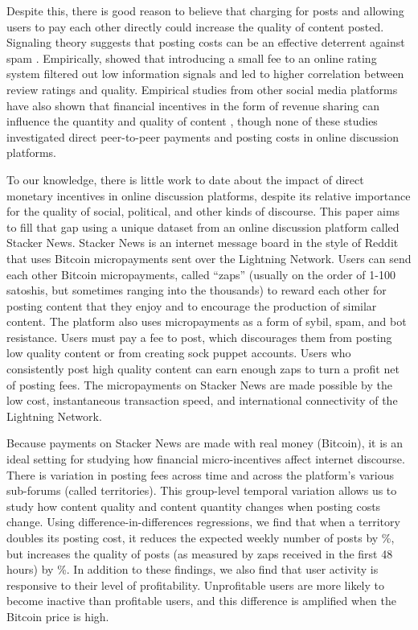 Despite this, there is good reason to believe that charging for posts and allowing users to pay each other directly could increase the quality of content posted. Signaling theory suggests that posting costs can be an effective deterrent against spam  \citep{joseph2008email}. Empirically, \citet{tchernichovski2019pnas} showed that introducing a small fee to an online rating system filtered out low information signals and led to higher correlation between review ratings and quality. Empirical studies from other social media platforms have also shown that financial incentives in the form of revenue sharing can influence the quantity and quality of content  \citep{sun2013blogs, elkomboz2023youtube, kerkhof2024youtube}, though none of these studies investigated direct peer-to-peer payments and posting costs in online discussion platforms.

To our knowledge, there is little work to date about the impact of direct monetary incentives in online discussion platforms, despite its relative importance for the quality of social, political, and other kinds of discourse. This paper aims to fill that gap using a unique dataset from an online discussion platform called Stacker News. Stacker News is an internet message board in the style of Reddit that uses Bitcoin micropayments sent over the Lightning Network. Users can send each other Bitcoin micropayments, called ``zaps'' (usually on the order of 1-100 satoshis, but sometimes ranging into the thousands) to reward each other for posting content that they enjoy and to encourage the production of similar content. The platform also uses micropayments as a form of sybil, spam, and bot resistance. Users must pay a fee to post, which discourages them from posting low quality content or from creating sock puppet accounts. Users who consistently post high quality content can earn enough zaps to turn a profit net of posting fees. The micropayments on Stacker News are made possible by the low cost, instantaneous transaction speed, and international connectivity of the Lightning Network. 

Because payments on Stacker News are made with real money (Bitcoin), it is an ideal setting for studying how financial micro-incentives affect internet discourse. There is variation in posting fees across time and across the platform's various sub-forums (called territories). This group-level temporal variation allows us to study how content quality and content quantity changes when posting costs change. Using difference-in-differences regressions, we find that when a territory doubles its posting cost, it reduces the expected weekly number of posts by \%, but increases the quality of posts (as measured by zaps received in the first 48 hours) by \%. In addition to these findings, we also find that user activity is responsive to their level of profitability. Unprofitable users are more likely to become inactive than profitable users, and this difference is amplified when the Bitcoin price is high. 

